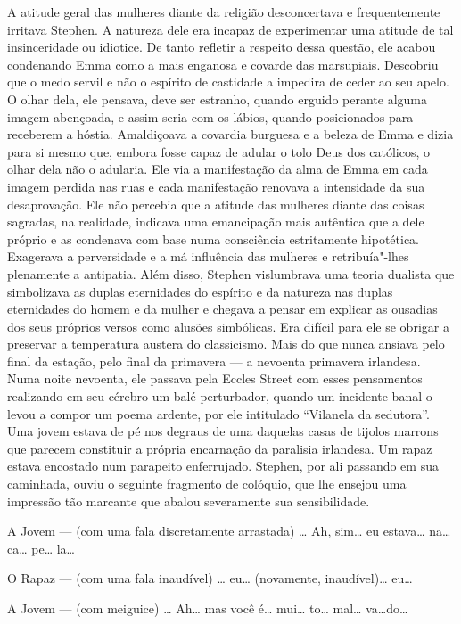 A atitude geral das mulheres diante da religião desconcertava e
frequentemente irritava Stephen.  A natureza dele era incapaz de
experimentar uma atitude de tal insinceridade ou idiotice.  De tanto
refletir a respeito dessa questão, ele acabou condenando Emma como a
mais enganosa e covarde das marsupiais.  Descobriu que o medo servil e
não o espírito de castidade a impedira de ceder ao seu apelo.  O olhar
dela, ele pensava, deve ser estranho, quando erguido perante alguma
imagem abençoada, e assim seria com os lábios, quando posicionados para
receberem a hóstia.  Amaldiçoava a covardia burguesa e a beleza de Emma
e dizia para si mesmo que, embora fosse capaz de adular o tolo Deus dos
católicos, o olhar dela não o adularia.  Ele via a manifestação da alma
de Emma em cada imagem perdida nas ruas e cada manifestação renovava a
intensidade da sua desaprovação.  Ele não percebia que a atitude das
mulheres diante das coisas sagradas, na realidade, indicava uma
emancipação mais autêntica que a dele próprio e as condenava com base
numa consciência estritamente hipotética.  Exagerava a perversidade e a
má influência das mulheres e retribuía"-lhes plenamente a antipatia. 
Além disso, Stephen vislumbrava uma teoria dualista que simbolizava as
duplas eternidades do espírito e da natureza nas duplas eternidades do
homem e da mulher e chegava a pensar em explicar as ousadias dos seus
próprios versos como alusões simbólicas.  Era difícil para ele se
obrigar a preservar a temperatura austera do classicismo.  Mais do que
nunca ansiava pelo final da estação, pelo final da primavera --- a
nevoenta primavera irlandesa.  Numa noite nevoenta, ele passava pela
Eccles Street com esses pensamentos realizando em seu cérebro um balé
perturbador, quando um incidente banal o levou a compor um \mbox{poema}
ardente, por ele intitulado “Vilanela da sedutora”.  Uma jovem estava
de pé nos degraus de uma daquelas casas de tijolos marrons que parecem
constituir a própria encarnação da paralisia irlandesa.  Um rapaz
estava encostado num parapeito enferrujado.  Stephen, por ali passando
em sua caminhada, ouviu o seguinte fragmento de colóquio, que lhe
ensejou uma impressão tão marcante que abalou severamente sua
sensibilidade.

A Jovem --- (com uma fala discretamente arrastada) \ldots{} Ah, sim\ldots{}
eu estava\ldots{} na\ldots{} ca\ldots{} pe\ldots{} la\ldots{}

O Rapaz --- (com uma fala inaudível) \ldots{} eu\ldots{} (novamente,
inaudível)\ldots{} eu\ldots{}

A Jovem --- (com meiguice) \ldots{} Ah\ldots{} mas você é\ldots{} mui\ldots{} to\ldots{}
mal\ldots{} va\ldots{}do\ldots{}

